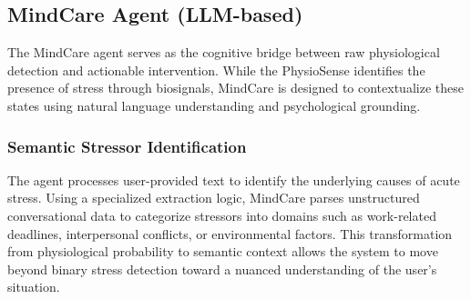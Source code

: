 \documentclass[journal,twoside,web]{ieeecolor}
\begin{document}






\subsection{MindCare Agent (LLM-based)}
The MindCare agent serves as the cognitive bridge between raw physiological detection and actionable intervention. While the PhysioSense identifies the presence of stress through biosignals, MindCare is designed to contextualize these states using natural language understanding and psychological grounding.

\subsubsection{Semantic Stressor Identification}
The agent processes user-provided text to identify the underlying causes of acute stress. Using a specialized extraction logic, MindCare parses unstructured conversational data to categorize stressors into domains such as work-related deadlines, interpersonal conflicts, or environmental factors. This transformation from physiological probability to semantic context allows the system to move beyond binary stress detection toward a nuanced understanding of the user’s situation.
\end{document}
